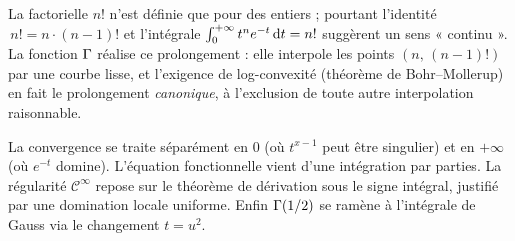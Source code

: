 \begin{significationintuitive}
La factorielle $n!$ n'est définie que pour des entiers ; pourtant l'identité
$\,n! = n\cdot(n-1)!$ et l'intégrale $\int_0^{+\infty} t^{n}e^{-t}\,\mathrm{d}t=n!$
suggèrent un sens « continu ». La fonction $\Gamma$ réalise ce prolongement :
elle interpole les points $(n,\,(n-1)!)$ par une courbe lisse, et l'exigence
de log-convexité (théorème de Bohr--Mollerup) en fait le prolongement
\emph{canonique}, à l'exclusion de toute autre interpolation raisonnable.
\end{significationintuitive}

\decsep{}


\begin{ideepreuve}
La convergence se traite séparément en $0$ (où $t^{x-1}$ peut être singulier)
et en $+\infty$ (où $e^{-t}$ domine). L'équation fonctionnelle vient d'une
intégration par parties. La régularité $\mathcal{C}^\infty$ repose sur le
théorème de dérivation sous le signe intégral, justifié par une domination
locale uniforme. Enfin $\Gamma(1/2)$ se ramène à l'intégrale de Gauss via le
changement $t=u^2$.
\end{ideepreuve}

\vspace{10pt}

